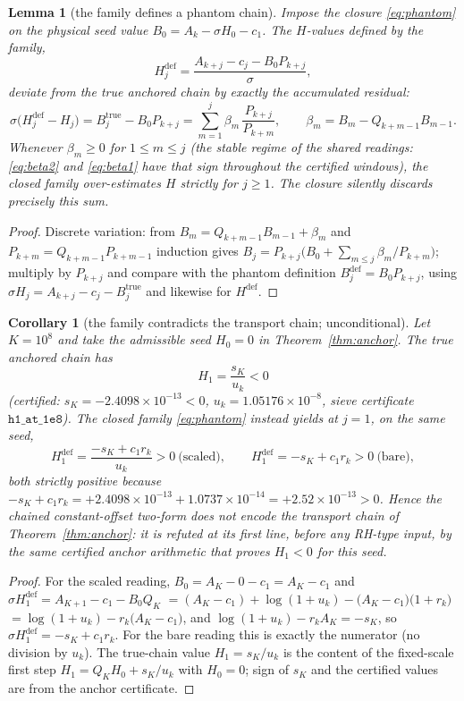 \documentclass[11pt]{article}
\newtheorem{lemma}[theorem]{Lemma}
\newtheorem{corollary}[theorem]{Corollary}
\theoremstyle{remark}
\newcommand{\uk}{u_k}
\newcommand{\rk}{r_k}
\begin{document}
\begin{lemma}[the family defines a phantom chain]\label{lem:phantom}
Impose the closure \eqref{eq:phantom} on the physical seed value
$B_0=A_k-\sigma H_0-c_1$. The $H$-values defined by the family,
\[
H^{\mathrm{def}}_j=\frac{A_{k+j}-c_j-B_0P_{k+j}}{\sigma},
\]
deviate from the true anchored chain by exactly the accumulated residual:
\[
\sigma\bigl(H^{\mathrm{def}}_j-H_j\bigr)
=B^{\mathrm{true}}_j-B_0P_{k+j}
=\sum_{m=1}^{j}\beta_m\,\frac{P_{k+j}}{P_{k+m}},
\qquad \beta_m=B_m-Q_{k+m-1}B_{m-1}.
\]
Whenever $\beta_m\ge0$ for $1\le m\le j$ (the stable regime of the shared
readings: \eqref{eq:beta2} and \eqref{eq:beta1} have that sign throughout the
certified windows), the closed family \emph{over-estimates} $H$ strictly
for $j\ge1$. The closure silently discards precisely this sum.
\end{lemma}

\begin{proof}
Discrete variation: from $B_m=Q_{k+m-1}B_{m-1}+\beta_m$ and
$P_{k+m}=Q_{k+m-1}P_{k+m-1}$ induction gives
$B_j=P_{k+j}\bigl(B_0+\sum_{m\le j}\beta_m/P_{k+m}\bigr)$; multiply by
$P_{k+j}$ and compare with the phantom definition
$B^{\mathrm{def}}_j=B_0P_{k+j}$, using
$\sigma H_j=A_{k+j}-c_j-B^{\mathrm{true}}_j$ and likewise for $H^{\mathrm{def}}$.
\end{proof}

\begin{corollary}[the family contradicts the transport chain; unconditional]
\label{cor:chainfalse}
Let $K=10^8$ and take the admissible seed $H_0=0$ in
Theorem~\ref{thm:anchor}. The true anchored chain has
\[
H_1=\frac{s_K}{\uk}<0
\]
(certified: $s_K=-2.4098\times10^{-13}<0$, $\uk=1.05176\times10^{-8}$,
sieve certificate $\texttt{h1\_at\_1e8}$). The closed family \eqref{eq:phantom}
instead yields at $j=1$, on the same seed,
\[
H^{\mathrm{def}}_1=\frac{-s_K+c_1\rk}{\uk}>0\ \text{(scaled)},\qquad
H^{\mathrm{def}}_1=-s_K+c_1\rk>0\ \text{(bare)},
\]
both strictly positive because $-s_K+c_1\rk=+2.4098\times10^{-13}
+1.0737\times10^{-14}=+2.52\times10^{-13}>0$. Hence the chained
constant-offset two-form does not encode the transport chain of
Theorem~\ref{thm:anchor}: it is refuted at its first line, before any
RH-type input, by the same certified anchor arithmetic that proves
$H_1<0$ for this seed.
\end{corollary}

\begin{proof}
For the scaled reading, $B_0=A_K-0-c_1=A_K-c_1$ and
$\sigma H^{\mathrm{def}}_1=A_{K+1}-c_1-B_0Q_K$
$=(A_K-c_1)+\log(1+\uk)-\bigl(A_K-c_1\bigr)\bigl(1+\rk\bigr)$
$=\log(1+\uk)-\rk\bigl(A_K-c_1\bigr)$, and
$\log(1+\uk)-\rk A_K=-s_K$, so $\sigma H^{\mathrm{def}}_1=-s_K+c_1\rk$. For
the bare reading this is exactly the numerator (no division by $\uk$). The
true-chain value $H_1=s_K/\uk$ is the content of the fixed-scale first
step $H_1=Q_KH_0+s_K/\uk$ with $H_0=0$; sign of $s_K$ and the certified
values are from the anchor certificate.
\end{proof}
\end{document}
